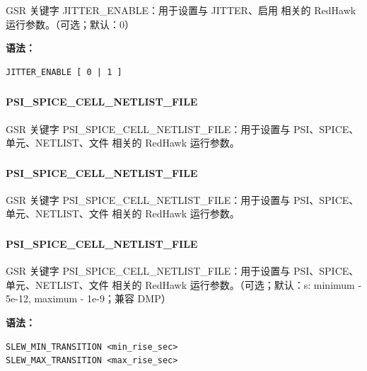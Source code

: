 GSR 关键字 JITTER_ENABLE：用于设置与 JITTER、启用 相关的 RedHawk 运行参数。（可选；默认：0）

\textbf{语法：}
\begin{lstlisting}
JITTER_ENABLE [ 0 | 1 ]
\end{lstlisting}

\subsubsection{}
\paragraph*{PSI_SPICE_CELL_NETLIST_FILE}

GSR 关键字 PSI_SPICE_CELL_NETLIST_FILE：用于设置与 PSI、SPICE、单元、NETLIST、文件 相关的 RedHawk 运行参数。

\subsubsection{}
\paragraph*{PSI_SPICE_CELL_NETLIST_FILE}

GSR 关键字 PSI_SPICE_CELL_NETLIST_FILE：用于设置与 PSI、SPICE、单元、NETLIST、文件 相关的 RedHawk 运行参数。

\subsubsection{}
\paragraph*{PSI_SPICE_CELL_NETLIST_FILE}

GSR 关键字 PSI_SPICE_CELL_NETLIST_FILE：用于设置与 PSI、SPICE、单元、NETLIST、文件 相关的 RedHawk 运行参数。（可选；默认：s: minimum - 5e-12, maximum - 1e-9；兼容 DMP）

\textbf{语法：}
\begin{lstlisting}
SLEW_MIN_TRANSITION <min_rise_sec>
SLEW_MAX_TRANSITION <max_rise_sec>
\end{lstlisting}

\subsubsection{}
